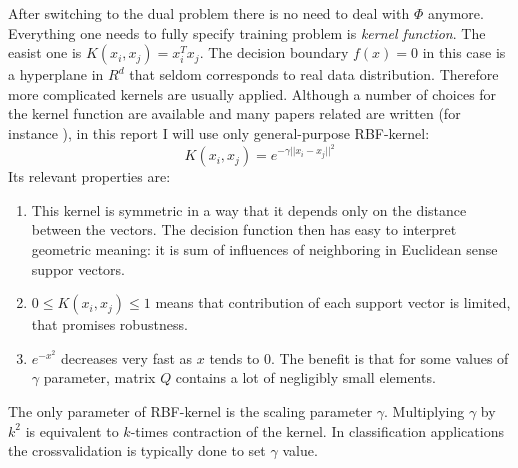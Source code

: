 After switching to the dual problem there is no need to deal with $\Phi$ anymore. Everything one needs to fully specify training problem is \textit{kernel function}. The easist one is $K(x_i, x_j) = x_i^T x_j$. The decision boundary $f(x)=0$ in this case is a hyperplane in $R^d$ that seldom corresponds to real data distribution. Therefore more complicated kernels are usually applied. Although a number of choices for the kernel function are available and many papers related are written (for instance \cite{lin2003study}), in this report I will use only general-purpose RBF-kernel:
\begin{equation}
K(x_i, x_j) = e^{-\gamma ||x_i - x_j||^2}
\end{equation}
Its relevant properties are:
\begin{enumerate}
\item
This kernel is symmetric in a way that it depends only on the distance between the vectors. The decision function then has easy to interpret geometric meaning: it is sum of influences of neighboring in Euclidean sense suppor vectors.
\item
$0 \leq K(x_i, x_j) \leq 1$ means that contribution of each support vector is limited, that promises robustness. 
\item
$e^{-x^2}$ decreases very fast as $x$ tends to $0$. The benefit is that for some values of $\gamma$ parameter, matrix $Q$ contains a lot of negligibly small elements.
\end{enumerate}
The only parameter of RBF-kernel is the scaling parameter $\gamma$. Multiplying $\gamma$ by $k^2$ is equivalent to $k$-times contraction of the kernel. In classification applications the crossvalidation is typically done to set $\gamma$ value.